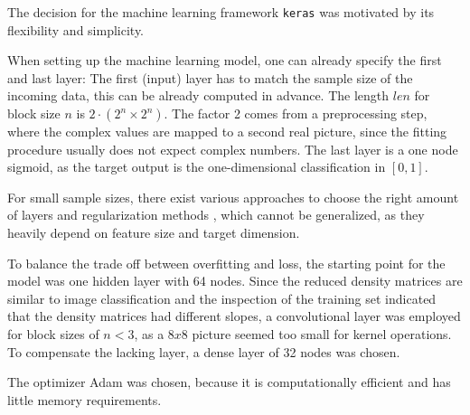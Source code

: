 \documentclass[reprint,amsmath,amssymb,aps,prb]{revtex4-2}
\begin{document}
The decision for the machine learning framework \texttt{keras} was motivated by its flexibility and simplicity. \cite{chollet2015keras}

When setting up the machine learning model, one can already specify the first and last layer: The first (input) layer has to match the sample size of the incoming data, this can be already computed in advance. The length $len$ for block size $n$ is $2\cdot\left(2^n\times 2^n \right)$. The factor 2 comes from a preprocessing step, where the complex values are mapped to a second real picture, since the fitting procedure usually does not expect complex numbers. The last layer is a one node sigmoid, as the target output is the one-dimensional classification in $\left[0,1\right]$.

For small sample sizes, there exist various approaches to choose the right amount of layers and regularization methods \cite{Olson2018,Feng2019}, which cannot be generalized, as they heavily depend on feature size and target dimension. 

To balance the trade off between overfitting and loss, the starting point for the model was one hidden layer with 64 nodes. Since the reduced density matrices are similar to image classification and the inspection of the training set indicated that the density matrices had different slopes, a convolutional layer was employed for block sizes of $n<3$, as a $8x8$ picture seemed too small for kernel operations. To compensate the lacking layer, a dense layer of 32 nodes was chosen.

The optimizer Adam was chosen, because it is computationally efficient and
has little memory requirements. \cite{Kingma2014}
\end{document}

